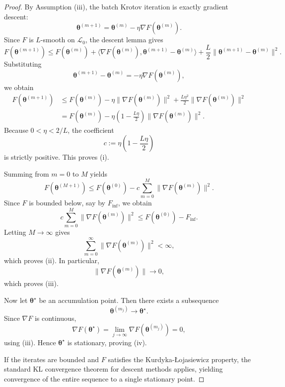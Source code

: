 \documentclass[aps,prb,10pt,twocolumn,superscriptaddress]{revtex4-2}
\begin{document}
\begin{proof}
By Assumption (iii), the batch Krotov iteration is exactly gradient descent:
\[
\bm{\theta}^{(m+1)}=\bm{\theta}^{(m)}-\eta \nabla F(\bm{\theta}^{(m)}).
\]
Since \(F\) is \(L\)-smooth on \(\mathcal{L}_0\), the descent lemma gives
\[
F(\bm{\theta}^{(m+1)})
\leq
F(\bm{\theta}^{(m)})
+
\langle \nabla F(\bm{\theta}^{(m)}),\bm{\theta}^{(m+1)}-\bm{\theta}^{(m)}\rangle
+
\frac{L}{2}\|\bm{\theta}^{(m+1)}-\bm{\theta}^{(m)}\|^2.
\]
Substituting
\[
\bm{\theta}^{(m+1)}-\bm{\theta}^{(m)}=-\eta \nabla F(\bm{\theta}^{(m)}),
\]
we obtain
\begin{align*}
F(\bm{\theta}^{(m+1)})
&\leq
F(\bm{\theta}^{(m)})
-
\eta\|\nabla F(\bm{\theta}^{(m)})\|^2
+
\frac{L\eta^2}{2}\|\nabla F(\bm{\theta}^{(m)})\|^2 \\
&=
F(\bm{\theta}^{(m)})
-
\eta\left(1-\frac{L\eta}{2}\right)\|\nabla F(\bm{\theta}^{(m)})\|^2.
\end{align*}
Because \(0<\eta<2/L\), the coefficient
\[
c:=\eta\left(1-\frac{L\eta}{2}\right)
\]
is strictly positive. This proves (i).

Summing from \(m=0\) to \(M\) yields
\[
F(\bm{\theta}^{(M+1)})
\leq
F(\bm{\theta}^{(0)})-c\sum_{m=0}^M \|\nabla F(\bm{\theta}^{(m)})\|^2.
\]
Since \(F\) is bounded below, say by \(F_{\inf}\), we obtain
\[
c\sum_{m=0}^M \|\nabla F(\bm{\theta}^{(m)})\|^2
\leq
F(\bm{\theta}^{(0)})-F_{\inf}.
\]
Letting \(M\to\infty\) gives
\[
\sum_{m=0}^{\infty}\|\nabla F(\bm{\theta}^{(m)})\|^2<\infty,
\]
which proves (ii). In particular,
\[
\|\nabla F(\bm{\theta}^{(m)})\|\to 0,
\]
which proves (iii).

Now let \(\bm{\theta}^{\star}\) be an accumulation point. Then there exists a subsequence
\[
\bm{\theta}^{(m_j)}\to \bm{\theta}^{\star}.
\]
Since \(\nabla F\) is continuous,
\[
\nabla F(\bm{\theta}^{\star})
=
\lim_{j\to\infty}\nabla F(\bm{\theta}^{(m_j)})
=
0,
\]
using (iii). Hence \(\bm{\theta}^{\star}\) is stationary, proving (iv).

If the iterates are bounded and \(F\) satisfies the Kurdyka-\L{}ojasiewicz property, the standard KL convergence theorem for descent methods applies, yielding convergence of the entire sequence to a single stationary point.
\end{proof}
\end{document}
